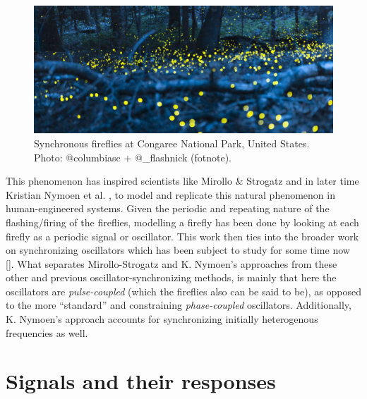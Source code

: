 \begin{figure}[!ht]
	\centering
	\includegraphics[width=0.9\linewidth]{Assets/DocSegments/Chapters/Background/Figures/Photos/synchronized_fireflies_phenomenon.jpg}
	\caption[Picture of fireflies flashing synchronously in a US National Park]{Synchronous fireflies at Congaree National Park, United States. Photo: @columbiasc + @\_flashnick (fotnote).} %
	\label{fig:synched_fireflies_phenomenon}
\end{figure}

This phenomenon has inspired scientists like Mirollo \& Strogatz \cite{mirollo_strogatz_PCO_synch} and in later time Kristian Nymoen et al. \cite{nymoen_synch}, to model and replicate this natural phenomenon in human-engineered systems. Given the periodic and repeating nature of the flashing/firing of the fireflies, modelling a firefly has been done by looking at each firefly as a periodic signal or oscillator. This work \cite{mirollo_strogatz_PCO_synch, nymoen_synch} then ties into the broader work on synchronizing oscillators which has been subject to study for some time now []. What separates Mirollo-Strogatz and K. Nymoen's approaches from these other and previous oscillator-synchronizing methods, is mainly that here the oscillators are \textit{pulse-coupled} (which the fireflies also can be said to be), as opposed to the more ``standard'' and constraining \textit{phase-coupled} oscillators. Additionally, K. Nymoen's approach accounts for synchronizing initially heterogenous frequencies as well.




\section{Signals and their responses}


